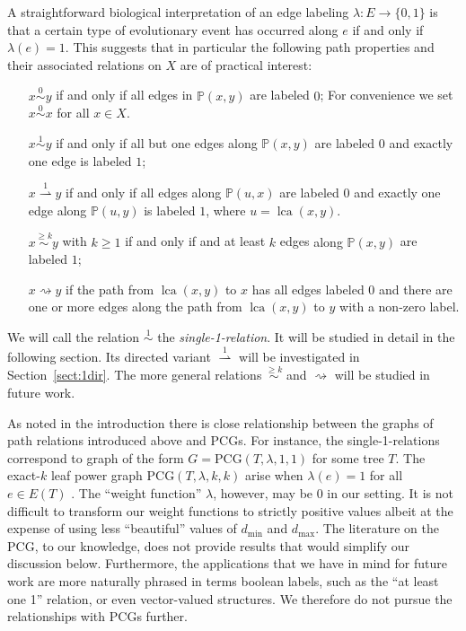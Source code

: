\documentclass[smallextended]{svjour3}
\let\cite\citep
\newcommand{\rev}[1]{\begingroup\color{blue}#1\endgroup}
\newcommand{\Ro}{\mathrel{\overset{0}{\sim}}}
\newcommand{\Rl}{\mathrel{\overset{1}{\sim}}}
\newcommand{\Rk}{\mathrel{\overset{\ge k}{\sim}}}
\newcommand{\Rld}{\mathrel{\overset{1}{\rightharpoonup}}}
\newcommand{\Rd}{\mathrel{\rightsquigarrow}}
\newcommand{\lca}[1]{\mathop{lca}(#1)}
\begin{document}
A straightforward biological interpretation of an edge labeling
\rev{$\lambda: E\to \{0,1\}$} is that a certain type of evolutionary event
has occurred along $e$ if and only if $\lambda(e)=1$. This suggests that in
particular the following path properties and their associated relations on
$X$ are of practical interest:
\begin{itemize}
\item[{$x \Ro y$}] if and only if all edges in $\mathbb{P}(x,y)$ are
  labeled $0$; For convenience we set $x \Ro x$ for all $x\in X$.
\item[{$x \Rl y$}] if and only if all but one edges along $\mathbb{P}(x,y)$
  are labeled $0$ and exactly one edge is labeled $1$;
\item[{$x \Rld y$}] if and only if all edges along $\mathbb{P}(u,x)$ are 
  labeled $0$ and exactly one edge along $\mathbb{P}(u,y)$ is labeled $1$,
  where $u=\lca{x,y}$. 
\item[{$x \Rk y$}] with \rev{$k\geq1$} if and only if and at least $k$
  edges \rev{along $\mathbb{P}(x,y)$} are labeled $1$;
\item[{$x \Rd y$}] if the path from $\lca{x,y}$ to $x$ has all edges
  labeled $0$ and there are one or more edges along the path from
  $\lca{x,y}$ to $y$ with a non-zero label. 
\end{itemize}
We will call the relation $\Rl$ the \emph{single-1-relation}. It will be
studied in detail in the following section. Its directed variant $\Rld$
will be investigated in Section~\ref{sect:1dir}. The more general relations
$\Rk$ and $\Rd$ will be studied \rev{in future work.} %

\rev{As noted in the introduction there is close relationship between the
  graphs of path relations introduced above and PCGs. For instance, the
  single-1-relations correspond to graph of the form $G =
  \mathrm{PCG}(T,\lambda,1,1)$ for some tree $T$. The exact-$k$ leaf power
  graph $\mathrm{PCG}(T,\lambda,k,k)$ arise when $\lambda(e)=1$ for all
  $e\in E(T)$ \cite{BVR:10}. The ``weight function'' $\lambda$, however,
  may be $0$ in our setting. It is not difficult to transform our weight
  functions to strictly positive values albeit at the expense of using less
  ``beautiful'' values of $d_{\min}$ and $d_{\max}$. The literature on the
  PCG, to our knowledge, does not provide results that would simplify our
  discussion below. Furthermore, the applications that we have in mind for
  future work are more naturally phrased in terms boolean labels, such as
  the ``at least one 1'' relation, or even vector-valued structures. We
  therefore do not pursue the relationships with PCGs further.}
\end{document}
